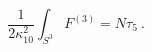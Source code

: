 \begin{equation}
\label{charge_quant}
  \frac1{2\kappa_{10}^2} \int_{S^3} F^{(3)} = N \tau_5~.
\end{equation}

